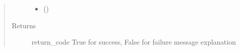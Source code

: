 \documentclass[letterpaper,10pt,english]{sphinxmanual}
\begin{document}
\begin{fulllineitems}
\begin{quote}
\begin{description}
\begin{itemize}
\item {} 
 () \textendash{} 

\end{itemize}

\item[{Returns}] \leavevmode
return\_code \sphinxhyphen{} True for success, False for failure
message \sphinxhyphen{} explanation

\end{description}\end{quote}

\end{fulllineitems}

\end{document}
